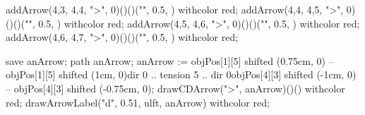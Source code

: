   addArrow(4,3, 4,4, ">", 0)()()("", 0.5, ) withcolor red;
  addArrow(4,4, 4,5, ">", 0)()()("", 0.5, ) withcolor red;
  addArrow(4,5, 4,6, ">", 0)()()("", 0.5, ) withcolor red;
  addArrow(4,6, 4,7, ">", 0)()()("", 0.5, ) withcolor red;

  save anArrow; path anArrow;
  anArrow :=
    objPos[1][5] shifted (0.75cm, 0) --
    objPos[1][5] shifted (1cm, 0){dir 0} ..
    tension 5 ..
    {dir 0}objPos[4][3] shifted (-1cm, 0) --
    objPos[4][3] shifted (-0.75cm, 0);
  drawCDArrow(">", anArrow)()() withcolor red;
  drawArrowLabel("d", 0.51, ulft, anArrow) withcolor red;

\stopMPcode\stopformula
\stopbuffer

\processTEXbuffer[cdBuf]

\typebuffer[cdBuf]

\stopchapter
